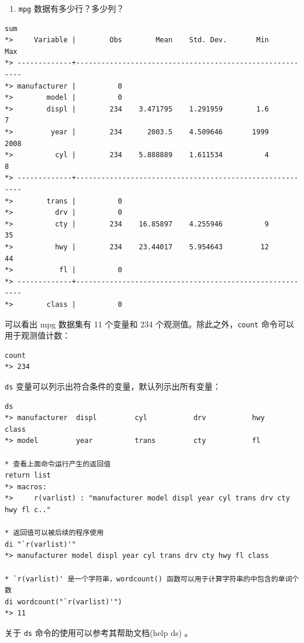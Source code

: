 \documentclass[]{ctexbook}
\providecommand{\tightlist}{%
  \setlength{\itemsep}{0pt}\setlength{\parskip}{0pt}}
\begin{document}
\begin{enumerate}
\def\labelenumi{\arabic{enumi}.}
\setcounter{enumi}{1}
\tightlist
\item
  \texttt{mpg} 数据有多少行？多少列？
\end{enumerate}

\begin{lstlisting}
sum
*>     Variable |        Obs        Mean    Std. Dev.       Min        Max
*> -------------+---------------------------------------------------------
*> manufacturer |          0
*>        model |          0
*>        displ |        234    3.471795    1.291959        1.6          7
*>         year |        234      2003.5    4.509646       1999       2008
*>          cyl |        234    5.888889    1.611534          4          8
*> -------------+---------------------------------------------------------
*>        trans |          0
*>          drv |          0
*>          cty |        234    16.85897    4.255946          9         35
*>          hwy |        234    23.44017    5.954643         12         44
*>           fl |          0
*> -------------+---------------------------------------------------------
*>        class |          0
\end{lstlisting}

可以看出 mpg 数据集有 11 个变量和 234 个观测值。除此之外，\texttt{count} 命令可以用于观测值计数：

\begin{lstlisting}
count
*> 234
\end{lstlisting}

\texttt{ds} 变量可以列示出符合条件的变量，默认列示出所有变量：

\begin{lstlisting}
ds
*> manufacturer  displ         cyl           drv           hwy           class
*> model         year          trans         cty           fl

* 查看上面命令运行产生的返回值
return list
*> macros:
*>     r(varlist) : "manufacturer model displ year cyl trans drv cty hwy fl c.."

* 返回值可以被后续的程序使用
di "`r(varlist)'"
*> manufacturer model displ year cyl trans drv cty hwy fl class

* `r(varlist)' 是一个字符串，wordcount() 函数可以用于计算字符串的中包含的单词个数
di wordcount("`r(varlist)'")
*> 11
\end{lstlisting}

关于 \texttt{ds} 命令的使用可以参考其帮助文档(help ds) 。
\end{document}
